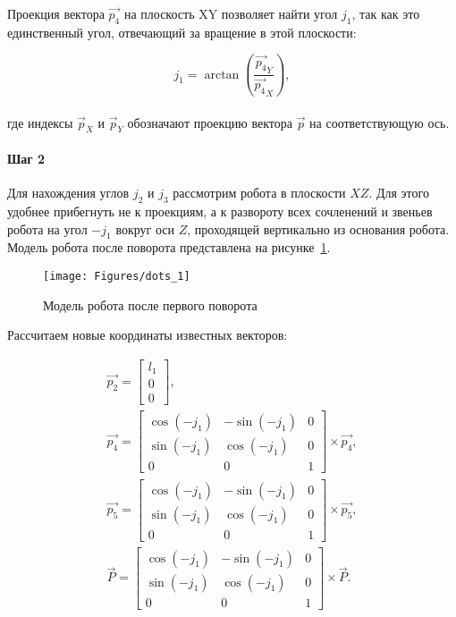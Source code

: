 Проекция вектора $\overrightarrow{p_4}$ на плоскость XY позволяет найти угол $j_1$, так как это единственный угол, отвечающий за вращение в этой плоскости:

\begin{equation*}
    j_1 = \arctan \left( \dfrac{\overrightarrow{p_4}_Y}{\overrightarrow{p_4}_X} \right),
\end{equation*} \\
где индексы $\overrightarrow{p}_X$ и $\overrightarrow{p}_Y$ обозначают проекцию вектора $\overrightarrow{p}$ на соответствующую ось.

\paragraph{Шаг 2}

Для нахождения углов $j_2$ и $j_3$ рассмотрим робота в плоскости $XZ$.
Для этого удобнее прибегнуть не к проекциям, а к развороту всех сочленений и звеньев робота на угол $-j_1$ вокруг оси $Z$, проходящей вертикально из основания робота.
Модель робота после поворота представлена на рисунке~\ref{fig:ikp:dots_1}.

\begin{figure}[H]
    \centering
    \vspace{14pt}
    \texttt{[image: Figures/dots\_1]}
    \caption{Модель робота после первого поворота}
    \label{fig:ikp:dots_1}
\end{figure}

Рассчитаем новые координаты известных векторов:

\begin{gather*}
    \overrightarrow{p_2} =
    \begin{bmatrix}
        l_1 \\
        0   \\
        0
    \end{bmatrix}, \\
    \overrightarrow{p_4} =
    \begin{bmatrix}
        \cos(-j_1) & -\sin(-j_1) & 0 \\
        \sin(-j_1) & \cos(-j_1)  & 0 \\
        0          & 0           & 1
    \end{bmatrix} \times \overrightarrow{p_4}, \\
    \overrightarrow{p_5} =
    \begin{bmatrix}
        \cos(-j_1) & -\sin(-j_1) & 0 \\
        \sin(-j_1) & \cos(-j_1)  & 0 \\
        0          & 0           & 1
    \end{bmatrix} \times \overrightarrow{p_5}, \\
    \overrightarrow{P} =
    \begin{bmatrix}
        \cos(-j_1) & -\sin(-j_1) & 0 \\
        \sin(-j_1) & \cos(-j_1)  & 0 \\
        0          & 0           & 1
    \end{bmatrix} \times \overrightarrow{P}.
\end{gather*} \\

